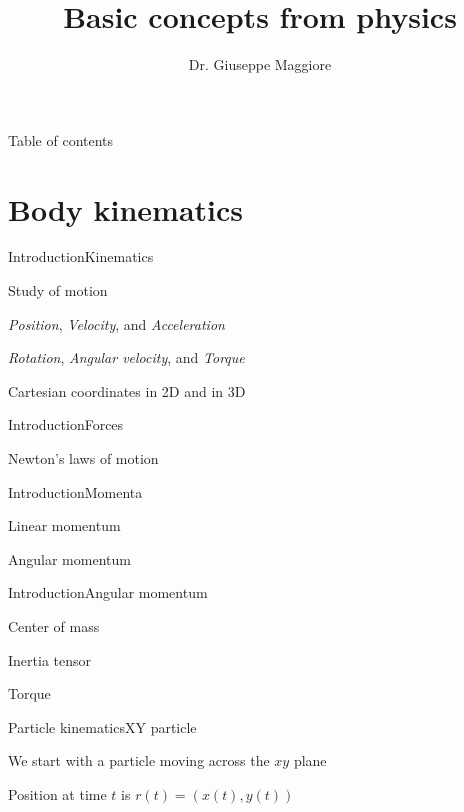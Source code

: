 \documentclass{beamer}
\title{Basic concepts from physics}
\author{Dr. Giuseppe Maggiore}
\institute{NHTV University of Applied Sciences \\ 
Breda, Netherlands}
\date{}
\begin{document}
\maketitle

\begin{frame}{Table of contents}
\tableofcontents
\end{frame}

\section{Body kinematics}
\begin{slide}{Introduction}{Kinematics}{
\item Study of motion
\item \textit{Position}, \textit{Velocity}, and \textit{Acceleration}
\item \textit{Rotation}, \textit{Angular velocity}, and \textit{Torque}
\item Cartesian coordinates in 2D and in 3D
}\end{slide}

\begin{slide}{Introduction}{Forces}{
\item Newton's laws of motion
}\end{slide}

\begin{slide}{Introduction}{Momenta}{
\item Linear momentum
\item Angular momentum
}\end{slide}

\begin{slide}{Introduction}{Angular momentum}{
\item Center of mass
\item Inertia tensor
\item Torque
}\end{slide}

\begin{slide}{Particle kinematics}{XY particle}{
\item We start with a particle moving across the $xy$ plane
\item Position at time $t$ is $r(t) = (x(t),y(t))$ %
}\end{slide}
\end{document}
